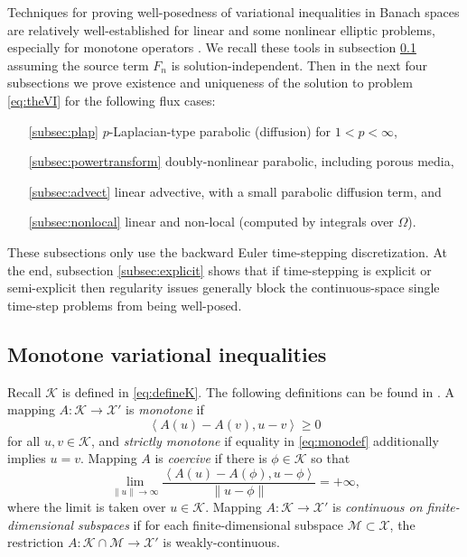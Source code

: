 \documentclass[final,onefignum]{siamart190516}
\newcommand{\ip}[2]{\ensuremath{\left<#1,#2\right>}}
\begin{document}
Techniques for proving well-posedness of variational inequalities in Banach spaces are relatively well-established for linear and some nonlinear elliptic problems, especially for monotone operators \cite{KinderlehrerStampacchia1980}.  We recall these tools in subsection \ref{subsec:mono} assuming the source term $F_n$ is solution-independent.  Then in the next four subsections we prove existence and uniqueness of the solution to problem \eqref{eq:theVI} for the following flux cases:
\begin{itemize}
\item[\ref{subsec:plap}] $p$-Laplacian-type parabolic (diffusion) for $1<p<\infty$,
\item[\ref{subsec:powertransform}] doubly-nonlinear parabolic, including porous media,
\item[\ref{subsec:advect}] linear advective, with a small parabolic diffusion term, and
\item[\ref{subsec:nonlocal}] linear and non-local (computed by integrals over $\Omega$).
\end{itemize}
These subsections only use the backward Euler time-stepping discretization.  At the end, subsection \ref{subsec:explicit} shows that if time-stepping is explicit or semi-explicit then regularity issues generally block the continuous-space single time-step problems from being well-posed.

\subsection{Monotone variational inequalities} \label{subsec:mono}  Recall $\mathcal{K}$ is defined in \eqref{eq:defineK}.  The following definitions can be found in \cite{KinderlehrerStampacchia1980}.  A mapping $A : \mathcal{K} \to \mathcal{X}'$ is \emph{monotone} if
\begin{equation}
   \ip{A(u) - A(v)}{u-v} \ge 0  \label{eq:monodef}
\end{equation}
for all $u,v\in\mathcal{K}$, and \emph{strictly monotone} if equality in \eqref{eq:monodef} additionally implies $u=v$.  Mapping $A$ is \emph{coercive} if there is $\phi\in \mathcal{K}$ so that
\begin{equation}
   \lim_{\|u\|\to\infty} \frac{\ip{A(u) - A(\phi)}{u-\phi}}{\|u-\phi\|} = +\infty, \label{eq:coercivedef}
\end{equation}
where the limit is taken over $u\in\mathcal{K}$.  Mapping $A : \mathcal{K} \to \mathcal{X}'$ is \emph{continuous on finite-dimensional subspaces} if for each finite-dimensional subspace $\mathcal{M} \subset \mathcal{X}$, the restriction $A : \mathcal{K}\cap \mathcal{M} \to \mathcal{X}'$ is weakly-continuous.
\end{document}
